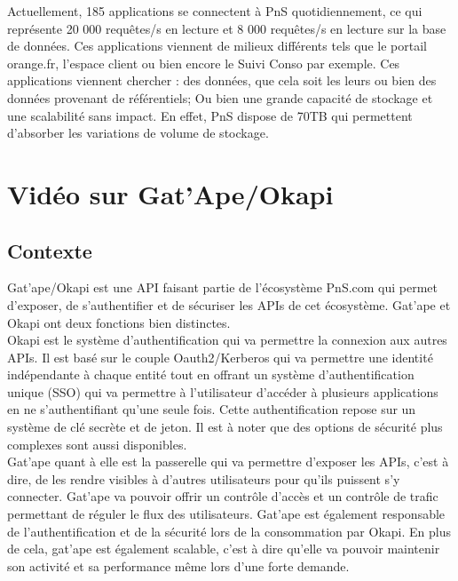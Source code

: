 Actuellement, 185 applications se connectent à PnS quotidiennement, ce qui représente 20 000 requêtes/s en lecture et 8 000 requêtes/s en lecture sur la base de données. Ces applications viennent de milieux différents tels que le portail orange.fr, l'espace client ou bien encore le Suivi Conso par exemple. Ces applications viennent chercher : des données, que cela soit les leurs ou bien des données provenant de référentiels; Ou bien une grande capacité de stockage et une scalabilité sans impact. En effet, PnS dispose de 70TB qui permettent d'absorber les variations de volume de stockage.

\section{Vidéo sur Gat'Ape/Okapi}

\subsection{Contexte}
Gat'ape/Okapi est une API faisant partie de l'écosystème PnS.com qui permet d'exposer, de s'authentifier et de sécuriser les APIs de cet écosystème. Gat'ape et Okapi ont deux fonctions bien distinctes.\\

Okapi est le système d'authentification qui va permettre la connexion aux autres APIs. Il est basé sur le couple Oauth2/Kerberos qui va permettre une identité indépendante à chaque entité tout en offrant un système d'authentification unique (SSO) qui va permettre à l'utilisateur d'accéder à plusieurs applications en ne s'authentifiant qu'une seule fois. Cette authentification repose sur un système de clé secrète et de jeton. Il est à noter que des options de sécurité plus complexes sont aussi disponibles.\\

Gat'ape quant à elle est la passerelle qui va permettre d'exposer les APIs, c'est à dire, de les rendre visibles à d'autres utilisateurs pour qu'ils puissent s'y connecter. Gat'ape va pouvoir offrir un contrôle d'accès et un contrôle de trafic permettant de réguler le flux des utilisateurs. Gat'ape est également responsable  de l'authentification et de la sécurité lors de la consommation par Okapi. En plus de cela, gat'ape est également scalable, c'est à dire qu'elle va pouvoir maintenir son activité et sa performance même lors d'une forte demande.\\

